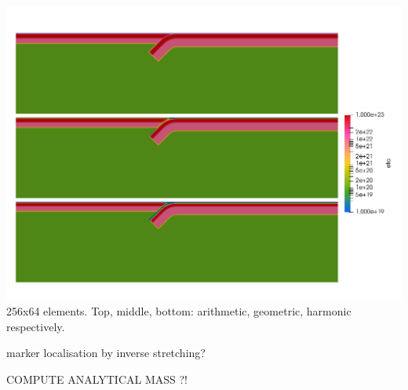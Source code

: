 \begin{center}
\includegraphics[width=14cm]{python_codes/fieldstone_67/images/eta_123}\\
{\captionfont 256x64 elements. Top, middle, bottom: arithmetic, geometric, harmonic respectively.}
\end{center}


marker localisation by inverse stretching?

COMPUTE ANALYTICAL MASS ?!
